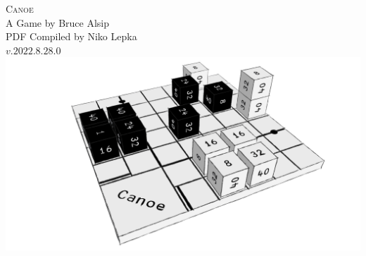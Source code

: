 



\begin{center}
    \Huge \textsc{Canoe}\\
    \LARGE A Game by Bruce Alsip\\
    \large PDF Compiled by Niko Lepka\\
    $v.2022.8.28.0$\\\vspace{1cm}
    \includegraphics[width=\textwidth]{../graphics/canoe-cover}
\end{center}
\newpage
\tableofcontents\newpage









